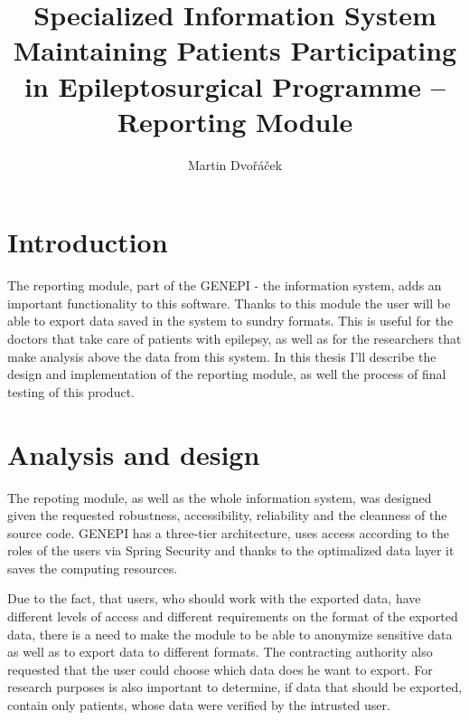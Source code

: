 \documentclass[thesis=B,english]{FITthesis}[2012/10/20]
\title{Specialized Information System Maintaining Patients Participating in Epileptosurgical Programme – Reporting Module}
\author{Martin Dvořáček} %
\begin{document}

\chapter{Introduction}
The reporting module, part of the GENEPI - the information system, adds an important functionality to this software. Thanks to this module the user will be able to export data saved in the system to sundry formats. This is useful for the doctors that take care of patients with epilepsy, as well as for the researchers that make analysis above the data from this system. In this thesis I'll describe the design and implementation of the reporting module, as well the process of final testing of this product.

\chapter{Analysis and design}
The repoting module, as well as the whole information system, was designed given the requested robustness, accessibility, reliability and the cleanness of the source code. GENEPI has a three-tier architecture, uses access according to the roles of the users via Spring Security and thanks to the optimalized data layer it saves the computing resources.

Due to the fact, that users, who should work with the exported data, have different levels of access and different requirements on the format of the exported data, there is a need to make the module to be able to anonymize sensitive data as well as to export data to different formats. The contracting authority also requested that the user could choose which data does he want to export. For research purposes is also important to determine, if data that should be exported, contain only patients, whose data were verified by the intrusted user.
\end{document}
